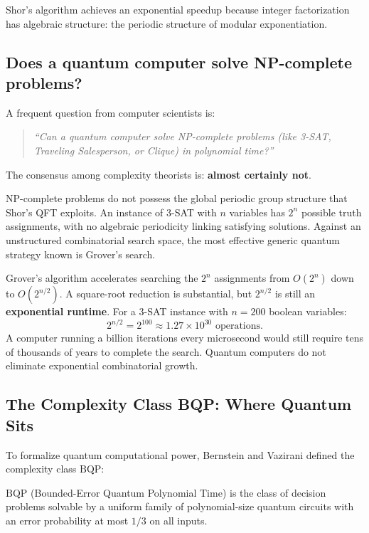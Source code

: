 Shor's algorithm achieves an exponential speedup because integer factorization has
algebraic structure: the periodic structure of modular exponentiation.

\subsection{Does a quantum computer solve NP-complete problems?}

A frequent question from computer scientists is:
\begin{quote}
\emph{``Can a quantum computer solve NP-complete problems (like 3-SAT, Traveling Salesperson,
or Clique) in polynomial time?''}
\end{quote}

The consensus among complexity theorists is: \textbf{almost certainly not}.

NP-complete problems do not possess the global periodic group structure that Shor's QFT
exploits. An instance of 3-SAT with $n$ variables has $2^n$ possible truth assignments,
with no algebraic periodicity linking satisfying solutions. Against an unstructured
combinatorial search space, the most effective generic quantum strategy known is Grover's
search.

Grover's algorithm accelerates searching the $2^n$ assignments from $O(2^n)$ down to
$O(2^{n/2})$. A square-root reduction is substantial, but $2^{n/2}$ is still an \textbf{exponential runtime}. For a 3-SAT instance
with $n = 200$ boolean variables:
\[
  2^{n/2} = 2^{100} \approx 1.27 \times 10^{30} \text{ operations.}
\]
A computer running a billion iterations every microsecond would still require tens of
thousands of years to complete the search. Quantum computers do not eliminate
exponential combinatorial growth.

\subsection{The Complexity Class BQP: Where Quantum Sits}

To formalize quantum computational power, Bernstein and Vazirani defined the complexity
class $\mathrm{BQP}$:

\begin{definition}[BQP]
$\mathrm{BQP}$ (Bounded-Error Quantum Polynomial Time) is the class of decision problems
solvable by a uniform family of polynomial-size quantum circuits with an error
probability at most $1/3$ on all inputs.
\end{definition}

